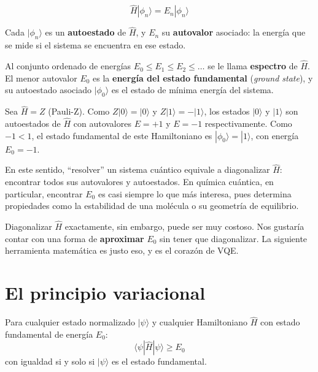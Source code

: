 \documentclass[12pt]{article}
\begin{document}
\[
\hat{H} |\phi_n\rangle = E_n |\phi_n\rangle
\]

Cada $|\phi_n\rangle$ es un \textbf{autoestado} de $\hat{H}$, y $E_n$ su
\textbf{autovalor} asociado: la energía que se mide si el sistema se
encuentra en ese estado.

\begin{importante}
Al conjunto ordenado de energías $E_0 \leq E_1 \leq E_2 \leq \dots$ se le
llama \textbf{espectro} de $\hat{H}$. El menor autovalor $E_0$ es la
\textbf{energía del estado fundamental} (\textit{ground state}), y su
autoestado asociado $|\phi_0\rangle$ es el estado de mínima energía del
sistema.
\end{importante}

\begin{ejemplo}[title=\textbf{Ejemplo: espectro de un Hamiltoniano de un qubit}]
Sea $\hat{H} = Z$ (Pauli-Z). Como $Z|0\rangle = |0\rangle$ y $Z|1\rangle =
-|1\rangle$, los estados $|0\rangle$ y $|1\rangle$ son autoestados de
$\hat{H}$ con autovalores $E=+1$ y $E=-1$ respectivamente. Como $-1 < 1$,
el estado fundamental de este Hamiltoniano es $|\phi_0\rangle = |1\rangle$,
con energía $E_0 = -1$.
\end{ejemplo}

En este sentido, ``resolver'' un sistema cuántico equivale a diagonalizar
$\hat{H}$: encontrar todos sus autovalores y autoestados. En química
cuántica, en particular, encontrar $E_0$ es casi siempre lo que más
interesa, pues determina propiedades como la estabilidad de una molécula o
su geometría de equilibrio.

Diagonalizar $\hat{H}$ exactamente, sin embargo, puede ser muy costoso.
Nos gustaría contar con una forma de \textbf{aproximar} $E_0$ sin tener que
diagonalizar. La siguiente herramienta matemática es justo eso, y es el
corazón de VQE.

\newpage

\section{El principio variacional}

\begin{importante}[title=\textbf{Principio variacional}]
Para cualquier estado normalizado $|\psi\rangle$ y cualquier Hamiltoniano
$\hat{H}$ con estado fundamental de energía $E_0$:
\[
\langle \psi | \hat{H} | \psi \rangle \geq E_0
\]
con igualdad si y solo si $|\psi\rangle$ es el estado fundamental.
\end{importante}
\end{document}
